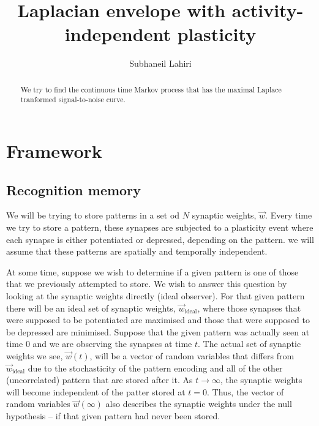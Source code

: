 \documentclass[12pt]{article}
\title{Laplacian envelope with activity-independent plasticity}
\author{Subhaneil Lahiri
%
}
\newcommand{\syn}{\vec{w}}
\newcommand{\synid}{\syn_\text{ideal}}
\begin{document}
\maketitle




\begin{abstract}
  We try to find the continuous time Markov process that has the maximal Laplace tranformed signal-to-noise curve.
\end{abstract}

\tableofcontents


\section{Framework}\label{sec:framework}

\subsection{Recognition memory}\label{sec:recog}


We will be trying to store patterns in a set od $N$ synaptic weights, $\syn$.
Every time we try to store a pattern, these synapses are subjected to a plasticity event where each synapse is either potentiated or depressed, depending on the pattern.
we will assume that these patterns are spatially and temporally independent.

At some time, suppose we wish to determine if a given pattern is one of those that we previously attempted to store.
We wish to answer this question by looking at the synaptic weights directly (ideal observer).
For that given pattern there will be an ideal set of synaptic weights, $\synid$, where those synapses that were supposed to be potentiated are maximised and those that were supposed to be depressed are minimised.
Suppose that the given pattern was actually seen at time 0 and we are observing the synapses at time $t$.
The actual set of synaptic weights we see, $\syn(t)$, will be a vector of random variables that differs from $\synid$ due to the stochasticity of the pattern encoding and all of the other (uncorrelated) pattern that are stored after it.
As $t\to\infty$, the synaptic weights will become independent of the patter stored at $t=0$.
Thus, the vector of random variables $\syn(\infty)$ also describes the synaptic weights under the null hypothesis -- if that given pattern had never been stored.
\end{document}

